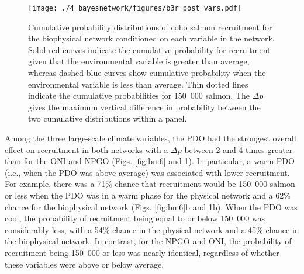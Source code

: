 \begin{figure}[htbp]
  \centering \texttt{[image: ./4\_bayesnetwork/figures/b3r\_post\_vars.pdf]}
  \caption[Cumulative probability distributions of coho salmon recruitment for
           the biophysical network conditioned on each variable in the
           network]{Cumulative probability distributions of coho salmon
           recruitment for the biophysical network conditioned on each variable
           in the network. Solid red curves indicate the cumulative probability
           for recruitment given that the environmental variable is greater than
           average, whereas dashed blue curves show cumulative probability when
           the environmental variable is less than average. Thin dotted lines
           indicate the cumulative probabilities for 150~000 salmon. The
           \(\Delta p\) gives the maximum vertical difference in probability
           between the two cumulative distributions within a panel.}
  \label{fig:bn:7}
\end{figure}

Among the three large-scale climate variables, the PDO had the strongest overall
effect on recruitment in both networks with a \(\Delta p\) between 2 and 4 times
greater than for the ONI and NPGO (Figs. \ref{fig:bn:6} and \ref{fig:bn:7}). In
particular, a warm PDO (i.e., when the PDO was above average) was associated
with lower recruitment. For example, there was a 71\% chance that recruitment
would be 150~000 salmon or less when the PDO was in a warm phase for the
physical network and a 62\% chance for the biophysical network (Figs.
\ref{fig:bn:6}b and \ref{fig:bn:7}b). When the PDO was cool, the probability of
recruitment being equal to or below 150~000 was considerably less, with a 54\%
chance in the physical network and a 45\% chance in the biophysical network. In
contrast, for the NPGO and ONI, the probability of recruitment being 150~000 or
less was nearly identical, regardless of whether these variables were above or
below average.

